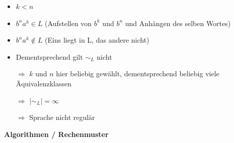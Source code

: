 \documentclass[11pt,a4paper]{article}
\begin{document}
\begin{itemize}
\begin{itemize}
\begin{itemize}
		\item $k < n$
		\item $b^n a^k \in L$ (Aufstellen von $b^k$ und $b^n$ und Anhängen des selben Wortes)
		\item $b^n a^k \notin L$ (Eins liegt in L, das andere nicht)
		\item Dementsprechend gilt $\sim_L$ nicht
		\item[$\Rightarrow$] $k$ und $n$ hier beliebig gewählt, dementsprechend beliebig viele Äquivalenzklassen
		\item[$\Rightarrow$] $|\sim_L| = \infty$
		\item[$\Rightarrow$] Sprache nicht regulär
		\end{itemize}
		
	\end{itemize}

\end{itemize}

\pagebreak





{\Large \textbf{Algorithmen / Rechenmuster}} 
\end{document}
